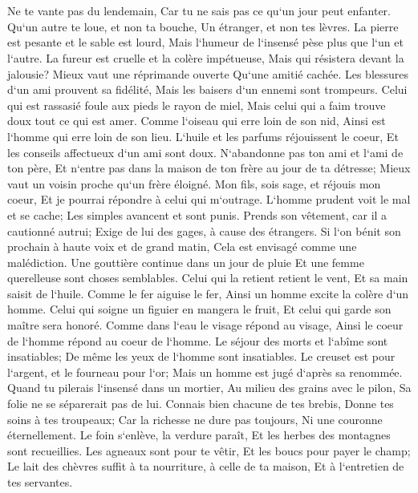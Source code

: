 \chapter{}

\verse Ne te vante pas du lendemain, Car tu ne sais pas ce qu`un jour peut enfanter. 
\verse Qu`un autre te loue, et non ta bouche, Un étranger, et non tes lèvres. 
\verse La pierre est pesante et le sable est lourd, Mais l`humeur de l`insensé pèse plus que l`un et l`autre. 
\verse La fureur est cruelle et la colère impétueuse, Mais qui résistera devant la jalousie? 
\verse Mieux vaut une réprimande ouverte Qu`une amitié cachée. 
\verse Les blessures d`un ami prouvent sa fidélité, Mais les baisers d`un ennemi sont trompeurs. 
\verse Celui qui est rassasié foule aux pieds le rayon de miel, Mais celui qui a faim trouve doux tout ce qui est amer. 
\verse Comme l`oiseau qui erre loin de son nid, Ainsi est l`homme qui erre loin de son lieu. 
\verse L`huile et les parfums réjouissent le coeur, Et les conseils affectueux d`un ami sont doux. 
\verse N`abandonne pas ton ami et l`ami de ton père, Et n`entre pas dans la maison de ton frère au jour de ta détresse; Mieux vaut un voisin proche qu`un frère éloigné. 
\verse Mon fils, sois sage, et réjouis mon coeur, Et je pourrai répondre à celui qui m`outrage. 
\verse L`homme prudent voit le mal et se cache; Les simples avancent et sont punis. 
\verse Prends son vêtement, car il a cautionné autrui; Exige de lui des gages, à cause des étrangers. 
\verse Si l`on bénit son prochain à haute voix et de grand matin, Cela est envisagé comme une malédiction. 
\verse Une gouttière continue dans un jour de pluie Et une femme querelleuse sont choses semblables. 
\verse Celui qui la retient retient le vent, Et sa main saisit de l`huile. 
\verse Comme le fer aiguise le fer, Ainsi un homme excite la colère d`un homme. 
\verse Celui qui soigne un figuier en mangera le fruit, Et celui qui garde son maître sera honoré. 
\verse Comme dans l`eau le visage répond au visage, Ainsi le coeur de l`homme répond au coeur de l`homme. 
\verse Le séjour des morts et l`abîme sont insatiables; De même les yeux de l`homme sont insatiables. 
\verse Le creuset est pour l`argent, et le fourneau pour l`or; Mais un homme est jugé d`après sa renommée. 
\verse Quand tu pilerais l`insensé dans un mortier, Au milieu des grains avec le pilon, Sa folie ne se séparerait pas de lui. 
\verse Connais bien chacune de tes brebis, Donne tes soins à tes troupeaux; 
\verse Car la richesse ne dure pas toujours, Ni une couronne éternellement. 
\verse Le foin s`enlève, la verdure paraît, Et les herbes des montagnes sont recueillies. 
\verse Les agneaux sont pour te vêtir, Et les boucs pour payer le champ; 
\verse Le lait des chèvres suffit à ta nourriture, à celle de ta maison, Et à l`entretien de tes servantes. 

